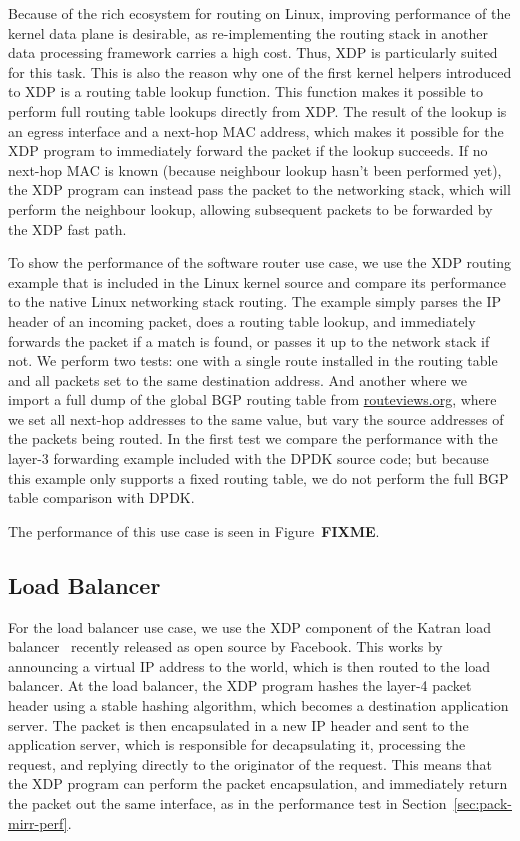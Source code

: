 \documentclass[10pt,sigconf]{acmart}
\begin{document}
Because of the rich ecosystem for routing on Linux, improving performance of the
kernel data plane is desirable, as re-implementing the routing stack in another
data processing framework carries a high cost. Thus, XDP is particularly suited
for this task. This is also the reason why one of the first kernel helpers
introduced to XDP is a routing table lookup function. This function makes it
possible to perform full routing table lookups directly from XDP. The result of
the lookup is an egress interface and a next-hop MAC address, which makes it
possible for the XDP program to immediately forward the packet if the lookup
succeeds. If no next-hop MAC is known (because neighbour lookup hasn't been
performed yet), the XDP program can instead pass the packet to the networking
stack, which will perform the neighbour lookup, allowing subsequent packets to
be forwarded by the XDP fast path.

To show the performance of the software router use case, we use the XDP routing
example that is included in the Linux kernel source and compare its performance
to the native Linux networking stack routing. The example simply parses the IP
header of an incoming packet, does a routing table lookup, and immediately
forwards the packet if a match is found, or passes it up to the network stack if
not. We perform two tests: one with a single route installed in the routing
table and all packets set to the same destination address. And another where we
import a full dump of the global BGP routing table from \url{routeviews.org},
where we set all next-hop addresses to the same value, but vary the source
addresses of the packets being routed. In the first test we compare the
performance with the layer-3 forwarding example included with the DPDK source
code; but because this example only supports a fixed routing table, we do not
perform the full BGP table comparison with DPDK.

The performance of this use case is seen in Figure~\textbf{FIXME}.

\subsection{Load Balancer}
\label{sec:load-balancer}
For the load balancer use case, we use the XDP component of the Katran load
balancer~\cite{katran} recently released as open source by Facebook. This works
by announcing a virtual IP address to the world, which is then routed to the
load balancer. At the load balancer, the XDP program hashes the layer-4 packet
header using a stable hashing algorithm, which becomes a destination application
server. The packet is then encapsulated in a new IP header and sent to the
application server, which is responsible for decapsulating it, processing the
request, and replying directly to the originator of the request. This means that
the XDP program can perform the packet encapsulation, and immediately return the
packet out the same interface, as in the performance test in
Section~\ref{sec:pack-mirr-perf}.
\end{document}
